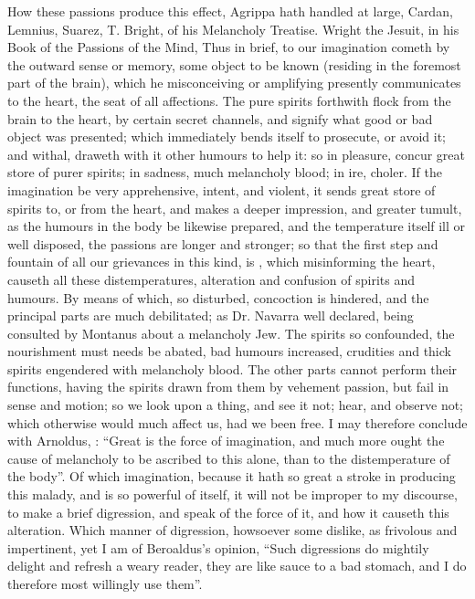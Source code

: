 How these passions produce this effect, Agrippa hath
handled at large,  Cardan,
 Lemnius,  Suarez,
 T. Bright,
 of his Melancholy Treatise. Wright the Jesuit,
in his Book of the Passions of the Mind, \etc{} Thus in brief, to our
imagination cometh by the outward sense or memory, some object to be known
(residing in the foremost part of the brain), which he misconceiving or
amplifying presently communicates to the heart, the seat of all affections. The
pure spirits forthwith flock from the brain to the heart, by certain secret
channels, and signify what good or bad object was presented;
which immediately bends itself to prosecute, or avoid it;
and withal, draweth with it other humours to help it: so in pleasure, concur
great store of purer spirits; in sadness, much melancholy blood; in ire,
choler. If the imagination be very apprehensive, intent, and violent, it sends
great store of spirits to, or from the heart, and makes a deeper impression,
and greater tumult, as the humours in the body be likewise prepared, and the
temperature itself ill or well disposed, the passions are longer and stronger;
so that the first step and fountain of all our grievances in this kind, is
, which misinforming the heart,
causeth all these distemperatures, alteration and confusion of spirits and
humours. By means of which, so disturbed, concoction is hindered, and the
principal parts are much debilitated; as Dr. Navarra well
declared, being consulted by Montanus about a melancholy Jew. The spirits so
confounded, the nourishment must needs be abated, bad humours increased,
crudities and thick spirits engendered with melancholy blood. The other parts
cannot perform their functions, having the spirits drawn from them by vehement
passion, but fail in sense and motion; so we look upon a thing, and see it not;
hear, and observe not; which otherwise would much affect us, had we been free.
I may therefore conclude with Arnoldus, : \enquote{Great is the force of imagination, and
much more ought the cause of melancholy to be ascribed to this alone, than to
the distemperature of the body}. Of which imagination, because it hath so great
a stroke in producing this malady, and is so powerful of itself, it will not be
improper to my discourse, to make a brief digression, and speak of the force of
it, and how it causeth this alteration. Which manner of digression, howsoever
some dislike, as frivolous and impertinent, yet I am of
Beroaldus's opinion, \enquote{Such digressions do mightily delight
and refresh a weary reader, they are like sauce to a bad stomach, and I do
therefore most willingly use them}.


